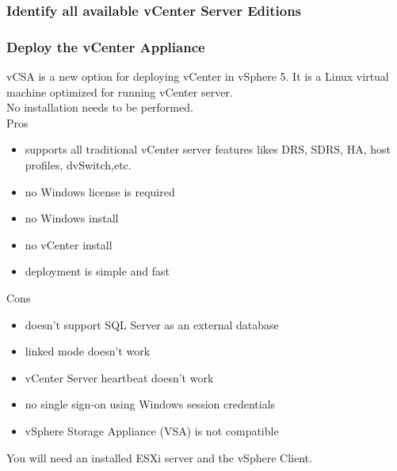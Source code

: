 \subsubsection{Identify all available vCenter Server Editions}

\subsubsection{Deploy the vCenter Appliance}

vCSA is a new option for deploying vCenter in vSphere 5. It is a Linux virtual machine optimized
for running vCenter server.\\

No installation needs to be performed.\\

Pros

\begin{itemize}
\item supports all traditional vCenter server features likes DRS, SDRS, HA, host profiles,
dvSwitch,etc.
\item no Windows license is required
\item no Windows install
\item no vCenter install
\item deployment is simple and fast
\end{itemize}

Cons

\begin{itemize}
\item doesn't support SQL Server as an external database
\item linked mode doesn't work
\item vCenter Server heartbeat doesn't work
\item no single sign-on using Windows session credentials
\item vSphere Storage Appliance (VSA) is not compatible
\end{itemize}

You will need an installed ESXi server and the vSphere Client.

